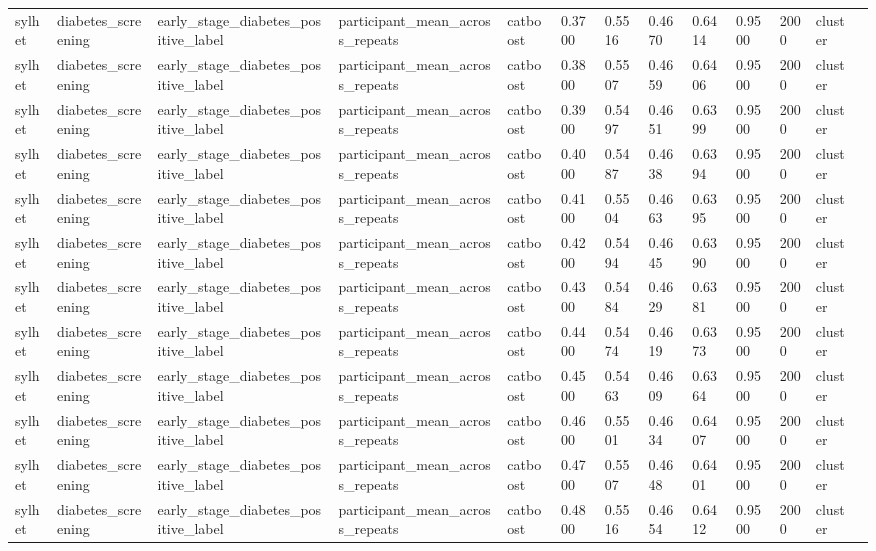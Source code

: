 \begin{tabular}{lllllllllllll}
sylhet & diabetes\_screening & early\_stage\_diabetes\_positive\_label & participant\_mean\_across\_repeats & catboost & 0.3700 & 0.5516 & 0.4670 & 0.6414 & 0.9500 & 2000 & cluster &  \\
sylhet & diabetes\_screening & early\_stage\_diabetes\_positive\_label & participant\_mean\_across\_repeats & catboost & 0.3800 & 0.5507 & 0.4659 & 0.6406 & 0.9500 & 2000 & cluster &  \\
sylhet & diabetes\_screening & early\_stage\_diabetes\_positive\_label & participant\_mean\_across\_repeats & catboost & 0.3900 & 0.5497 & 0.4651 & 0.6399 & 0.9500 & 2000 & cluster &  \\
sylhet & diabetes\_screening & early\_stage\_diabetes\_positive\_label & participant\_mean\_across\_repeats & catboost & 0.4000 & 0.5487 & 0.4638 & 0.6394 & 0.9500 & 2000 & cluster &  \\
sylhet & diabetes\_screening & early\_stage\_diabetes\_positive\_label & participant\_mean\_across\_repeats & catboost & 0.4100 & 0.5504 & 0.4663 & 0.6395 & 0.9500 & 2000 & cluster &  \\
sylhet & diabetes\_screening & early\_stage\_diabetes\_positive\_label & participant\_mean\_across\_repeats & catboost & 0.4200 & 0.5494 & 0.4645 & 0.6390 & 0.9500 & 2000 & cluster &  \\
sylhet & diabetes\_screening & early\_stage\_diabetes\_positive\_label & participant\_mean\_across\_repeats & catboost & 0.4300 & 0.5484 & 0.4629 & 0.6381 & 0.9500 & 2000 & cluster &  \\
sylhet & diabetes\_screening & early\_stage\_diabetes\_positive\_label & participant\_mean\_across\_repeats & catboost & 0.4400 & 0.5474 & 0.4619 & 0.6373 & 0.9500 & 2000 & cluster &  \\
sylhet & diabetes\_screening & early\_stage\_diabetes\_positive\_label & participant\_mean\_across\_repeats & catboost & 0.4500 & 0.5463 & 0.4609 & 0.6364 & 0.9500 & 2000 & cluster &  \\
sylhet & diabetes\_screening & early\_stage\_diabetes\_positive\_label & participant\_mean\_across\_repeats & catboost & 0.4600 & 0.5501 & 0.4634 & 0.6407 & 0.9500 & 2000 & cluster &  \\
sylhet & diabetes\_screening & early\_stage\_diabetes\_positive\_label & participant\_mean\_across\_repeats & catboost & 0.4700 & 0.5507 & 0.4648 & 0.6401 & 0.9500 & 2000 & cluster &  \\
sylhet & diabetes\_screening & early\_stage\_diabetes\_positive\_label & participant\_mean\_across\_repeats & catboost & 0.4800 & 0.5516 & 0.4654 & 0.6412 & 0.9500 & 2000 & cluster &  \\

\end{tabular}
